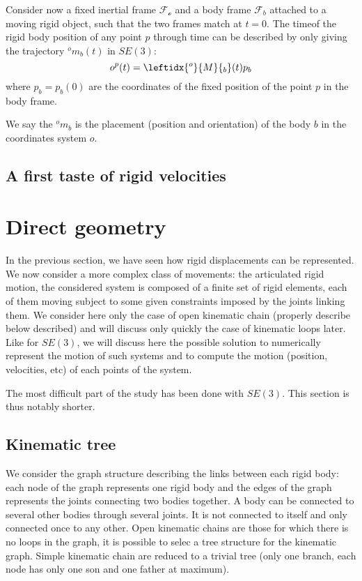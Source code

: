 \documentclass{book}
\begin{document}
Consider now a fixed inertial frame $\mathcal{F_o}$ and a body frame $\mathcal{F}_b$ attached to a moving rigid object, such that the two frames match at $t=0$. The  timeof the rigid body position of any point $p$ through time can be described by only giving the trajectory $^om_b(t)$ in $SE(3)$:
\[ o^p(t)  = \leftidx{^o}{M}{_b}(t) p_b\]
where $p_b = p_b(0)$ are the coordinates of the fixed position of the point $p$ in the body frame.

We say the $^om_b$ is the placement (\mie position and orientation) of the body $b$ in the coordinates system $o$.

\subsection{A first taste of rigid velocities}

\section{Direct geometry} \label{sec:directgeom}

In the previous section, we have seen how rigid displacements can be represented. We now consider a more complex class of movements: the articulated rigid motion, \mie the considered system is composed of a finite set of rigid elements, each of them moving subject to some given  constraints imposed by the joints linking them. We consider here only the case of open kinematic chain (properly describe below described) and will discuss only quickly the case of kinematic loops later.  Like for $SE(3)$, we will discuss here the possible solution to numerically represent the motion of such systems and to compute the motion (position, velocities, etc) of each points of the system.

The most difficult part of the study has been done with $SE(3)$. This section is thus notably shorter.

\subsection{Kinematic tree}

We consider the graph structure describing the links between each rigid body: each node of the graph represents one rigid body and the edges of the graph represents the joints connecting two bodies together. A body can be connected to several other bodies through several joints. It is not connected to itself and only connected once to any other. Open kinematic chains are those for which there is no loops in the graph, \mie it is possible to selec a tree structure for the kinematic graph. Simple kinematic chain are reduced to a trivial tree (only one branch, each node has only one son and one father at maximum).
\end{document}
